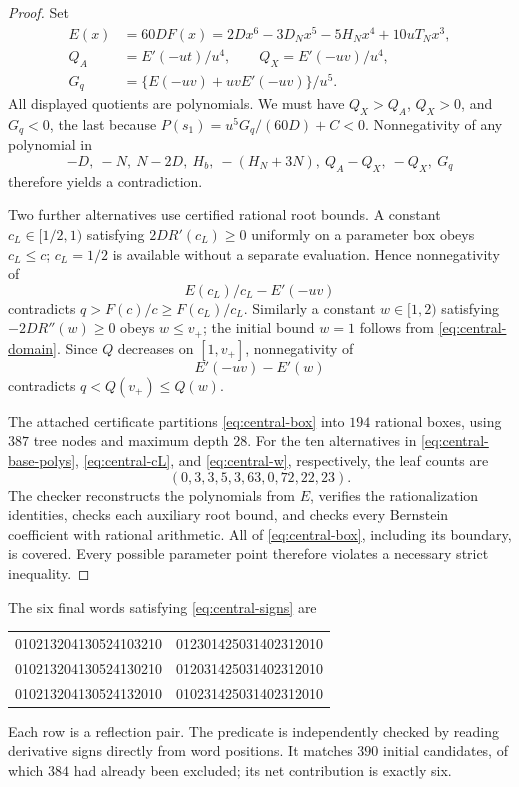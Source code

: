 \documentclass[11pt]{article}
\theoremstyle{definition}
\begin{document}
\begin{proof}
Set
\begin{align}
 E(x)&=60DF(x)=2Dx^6-3D_Nx^5-5H_Nx^4+10uT_Nx^3,\\
 Q_A&=E'(-ut)/u^4,\qquad Q_X=E'(-uv)/u^4,\\
 G_q&=\{E(-uv)+uvE'(-uv)\}/u^5.
\end{align}
All displayed quotients are polynomials. We must have
$Q_X>Q_A$, $Q_X>0$, and $G_q<0$, the last because
$P(s_1)=u^5G_q/(60D)+C<0$. Nonnegativity of any polynomial in
\begin{equation}\label{eq:central-base-polys}
 -D,\ -N,\ N-2D,\ H_b,\ -(H_N+3N),\ Q_A-Q_X,\ -Q_X,\ G_q
\end{equation}
therefore yields a contradiction.

Two further alternatives use certified rational root bounds. A constant
$c_L\in[1/2,1)$ satisfying $2DR'(c_L)\ge0$ uniformly on a parameter box
obeys $c_L\le c$; $c_L=1/2$ is available without a separate evaluation.
Hence nonnegativity of
\begin{equation}\label{eq:central-cL}
 E(c_L)/c_L-E'(-uv)
\end{equation}
contradicts $q>F(c)/c\ge F(c_L)/c_L$.
Similarly a constant $w\in[1,2)$ satisfying $-2DR''(w)\ge0$ obeys
$w\le v_+$; the initial bound $w=1$ follows from
\eqref{eq:central-domain}. Since $Q$ decreases on $[1,v_+]$, nonnegativity of
\begin{equation}\label{eq:central-w}
 E'(-uv)-E'(w)
\end{equation}
contradicts $q<Q(v_+)\le Q(w)$.

The attached certificate partitions \eqref{eq:central-box} into $194$
rational boxes, using $387$ tree nodes and maximum depth $28$. For the
ten alternatives in \eqref{eq:central-base-polys},
\eqref{eq:central-cL}, and \eqref{eq:central-w}, respectively, the leaf
counts are
\begin{equation}
 (0,3,3,5,3,63,0,72,22,23).
\end{equation}
The checker reconstructs the polynomials from $E$, verifies the
rationalization identities, checks each auxiliary root bound, and
checks every Bernstein coefficient with rational arithmetic. All of
\eqref{eq:central-box}, including its boundary, is covered. Every possible
parameter point therefore violates a necessary strict inequality.
\end{proof}

The six final words satisfying \eqref{eq:central-signs} are
\begin{center}\ttfamily\small
\begin{tabular}{ll}
010213204130524103210&012301425031402312010\\
010213204130524130210&012031425031402312010\\
010213204130524132010&010231425031402312010
\end{tabular}
\end{center}
Each row is a reflection pair. The predicate is independently checked
by reading derivative signs directly from word positions. It matches
$390$ initial candidates, of which $384$ had already been excluded;
its net contribution is exactly six.
\end{document}
